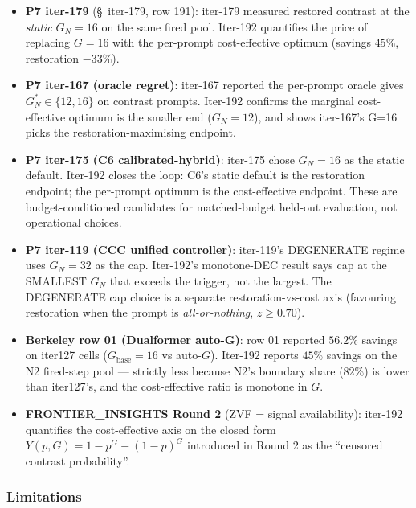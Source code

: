 \begin{itemize}
\item \textbf{P7 iter-179} (\S~iter-179, row 191): iter-179 measured
restored contrast at the \emph{static} $G_N = 16$ on the same fired
pool. Iter-192 quantifies the price of replacing $G = 16$ with the
per-prompt cost-effective optimum (savings $45\%$, restoration $-33\%$).
\item \textbf{P7 iter-167 (oracle regret)}: iter-167 reported the
per-prompt oracle gives $G_N^* \in \{12, 16\}$ on contrast prompts.
Iter-192 confirms the marginal cost-effective optimum is the smaller
end ($G_N = 12$), and shows iter-167's G=16 picks the
restoration-maximising endpoint.
\item \textbf{P7 iter-175 (C6 calibrated-hybrid)}: iter-175 chose
$G_N = 16$ as the static default. Iter-192 closes the loop: C6's
static default is the restoration endpoint; the per-prompt optimum is
the cost-effective endpoint.  These are budget-conditioned candidates for
matched-budget held-out evaluation, not operational choices.
\item \textbf{P7 iter-119 (CCC unified controller)}: iter-119's
DEGENERATE regime uses $G_N = 32$ as the cap. Iter-192's monotone-DEC
result says cap at the SMALLEST $G_N$ that exceeds the trigger, not
the largest. The DEGENERATE cap choice is a separate
restoration-vs-cost axis (favouring restoration when the prompt is
\emph{all-or-nothing}, $z \ge 0.70$).
\item \textbf{Berkeley row 01 (Dualformer auto-G)}: row 01 reported
$56.2\%$ savings on iter127 cells ($G_{\mathrm{base}}{=}16$ vs
auto-$G$). Iter-192 reports $45\%$ savings on the N2 fired-step pool
--- strictly less because N2's boundary share ($82\%$) is lower than
iter127's, and the cost-effective ratio is monotone in $G$.
\item \textbf{FRONTIER\_INSIGHTS Round 2} (ZVF = signal availability):
iter-192 quantifies the cost-effective axis on the closed form
$Y(p, G) = 1 - p^G - (1-p)^G$ introduced in Round 2 as the
``censored contrast probability''.
\end{itemize}

\subsubsection*{Limitations}


